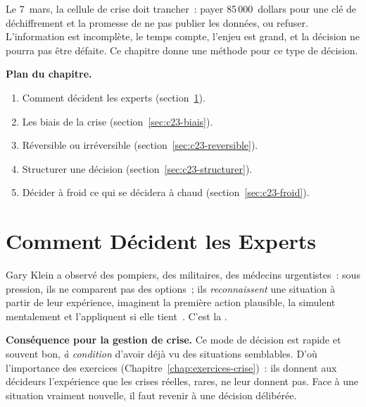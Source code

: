 Le 7~mars, la cellule de crise doit trancher~: payer 85\,000~dollars pour
une clé de déchiffrement et la promesse de ne pas publier les données, ou
refuser. L'information est incomplète, le temps compte, l'enjeu est grand,
et la décision ne pourra pas être défaite. Ce chapitre donne une méthode
pour ce type de décision.

\medskip
\textbf{Plan du chapitre.}
\begin{enumerate}
    \item Comment décident les experts (section~\ref{sec:c23-klein}).
    \item Les biais de la crise (section~\ref{sec:c23-biais}).
    \item Réversible ou irréversible (section~\ref{sec:c23-reversible}).
    \item Structurer une décision (section~\ref{sec:c23-structurer}).
    \item Décider à froid ce qui se décidera à chaud (section~\ref{sec:c23-froid}).
\end{enumerate}

\separateur

\section{Comment Décident les Experts}
\label{sec:c23-klein}

Gary Klein a observé des pompiers, des militaires, des médecins
urgentistes~: sous pression, ils ne comparent pas des options~; ils
\emph{reconnaissent} une situation à partir de leur expérience, imaginent
la première action plausible, la simulent mentalement et l'appliquent si
elle tient~\cite{klein1998}. C'est la .

\begin{boxinfo}
\textbf{Conséquence pour la gestion de crise.} Ce mode de décision est
rapide et souvent bon, \emph{à condition} d'avoir déjà vu des situations
semblables. D'où l'importance des exercices (Chapitre~\ref{chap:exercices-crise})~:
ils donnent aux décideurs l'expérience que les crises réelles, rares, ne
leur donnent pas. Face à une situation vraiment nouvelle, il faut revenir
à une décision délibérée.
\end{boxinfo}

